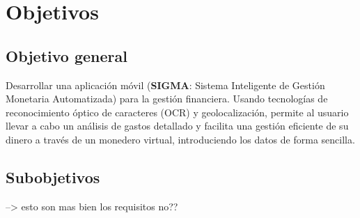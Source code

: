 \section{Objetivos} \label{sect:goals}
\subsection{Objetivo general}
Desarrollar una aplicación móvil (\textbf{SIGMA}: Sistema Inteligente de Gestión Monetaria Automatizada) 
para la gestión financiera. Usando tecnologías de reconocimiento
óptico de caracteres (OCR) y geolocalización, permite al usuario llevar a cabo un 
análisis de gastos detallado y facilita una gestión eficiente de su dinero
a través de un monedero virtual, introduciendo los datos de 
forma sencilla.

\subsection{Subobjetivos} --> esto son mas bien los requisitos no??
